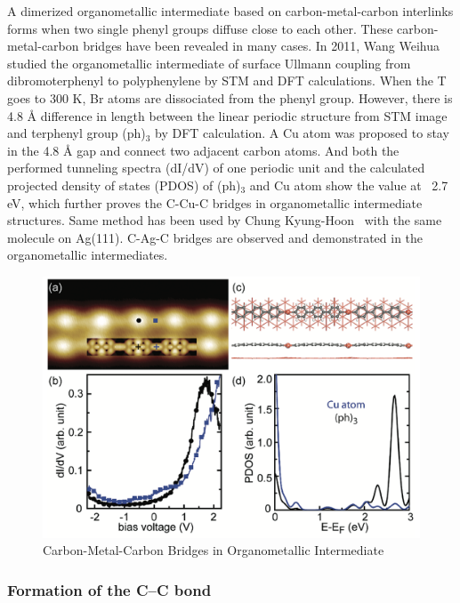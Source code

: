 \documentclass[aps,reprint,amsmath,amssymb]{revtex4-2}
\begin{document}
A dimerized organometallic intermediate based on carbon-metal-carbon interlinks forms when two single phenyl groups diffuse close to each other. 
These carbon-metal-carbon bridges have been revealed in many cases. In 2011, Wang Weihua~\cite{jacs2011} studied the organometallic intermediate of surface Ullmann coupling from dibromoterphenyl to polyphenylene by STM and DFT calculations. When the T goes to 300 K, Br atoms are dissociated from the phenyl group. However, there is 4.8 \si{\angstrom} difference in length between the linear periodic structure from STM image and terphenyl group (ph)$_{3}$ by DFT calculation. A Cu atom was proposed to stay in the 4.8 \si{\angstrom} gap and connect two adjacent carbon atoms. And both the performed tunneling spectra (dI/dV) of one periodic unit and the calculated projected density of states (PDOS) of (ph)$_{3}$ and Cu atom show the value at ~2.7 eV, which further proves the C-Cu-C bridges in organometallic intermediate structures. Same method has been used by Chung Kyung-Hoon~\cite{PCCP2012} with the same molecule on Ag(111). C-Ag-C bridges are observed and demonstrated in the organometallic intermediates.

\begin{figure}[ht]
\centering
\includegraphics[width=0.98\columnwidth]{Fig/Organometallic.png}
\caption{Carbon-Metal-Carbon Bridges in Organometallic Intermediate}
\label{fig:organ}
\end{figure}


\subsubsection{Formation of the C--C bond}
\end{document}
